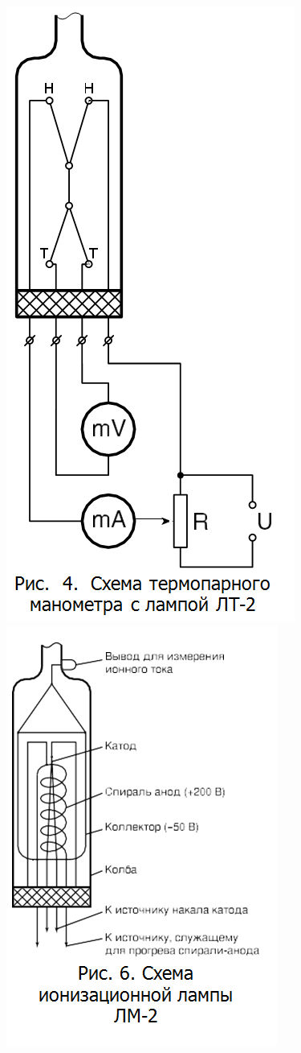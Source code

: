 \documentclass[11pt]{article}
\begin{document}
\includegraphics[scale=0.7]{pic4.png}
\includegraphics[scale=0.7]{pic6.png}
\end{document}
